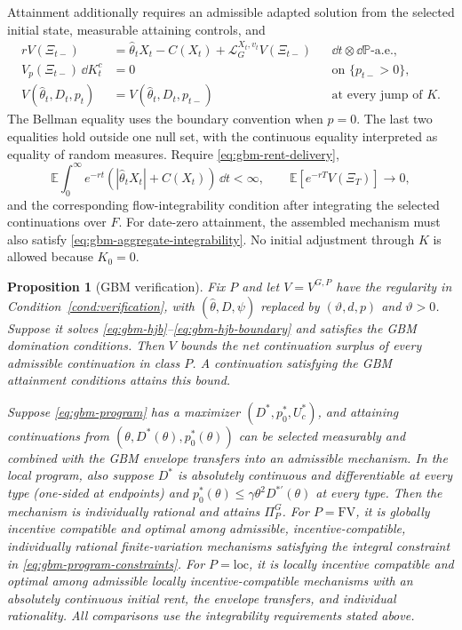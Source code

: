 \documentclass[12pt]{article}
\newtheorem{prop}{Proposition}
\newcommand{\E}{\mathbb{E}}
\newcommand{\hth}{\hat\theta}
\begin{document}
Attainment additionally requires an admissible adapted solution from
the selected initial state, measurable attaining controls, and
\begin{align*}
 rV(\Xi_{t-})
   &=\hth_tX_t-C(X_t)+\mathcal L_G^{X_t,v_t}V(\Xi_{t-})
       &&\dd t\otimes\dd\mathbb P\text{-a.e.},\\
 V_p(\Xi_{t-})\,\dd K_t^c&=0
       &&\text{on }\{p_{t-}>0\},\\
 V(\hth_t,D_t,p_t)&=V(\hth_t,D_t,p_{t-})
       &&\text{at every jump of }K.
\end{align*}
The Bellman equality uses the boundary convention when \(p=0\).
The last two equalities hold outside one null set, with the
continuous equality interpreted as equality of random measures.
Require \eqref{eq:gbm-rent-delivery},
\[
  \E\int_0^\infty e^{-rt}(|\hth_tX_t|+C(X_t))\,\dd t<\infty,
  \qquad \E[e^{-rT}V(\Xi_T)]\longrightarrow0,
\]
and the corresponding flow-integrability condition after integrating
the selected continuations over \(F\). For date-zero attainment, the
assembled mechanism must also satisfy
\eqref{eq:gbm-aggregate-integrability}. No initial adjustment through
\(K\) is allowed because \(K_0=0\).

\begin{prop}[GBM verification]\label{prop:gbm-verification}
Fix \(P\) and let \(V=V^{G,P}\) have the regularity in
Condition~\ref{cond:verification}, with \((\hth,D,\psi)\) replaced by
\((\vartheta,d,p)\) and \(\vartheta>0\). Suppose it solves
\eqref{eq:gbm-hjb}--\eqref{eq:gbm-hjb-boundary} and satisfies the
GBM domination conditions. Then \(V\) bounds the net continuation
surplus of every admissible continuation in class \(P\). A
continuation satisfying the GBM attainment conditions attains this
bound.

Suppose \eqref{eq:gbm-program} has a maximizer
\((D^*,p_0^*,U_c^*)\), and attaining continuations from
\((\theta,D^*(\theta),p_0^*(\theta))\) can be selected measurably
and combined with the GBM envelope transfers into an admissible
mechanism. In the local program, also suppose \(D^*\) is absolutely
continuous and differentiable at every type (one-sided at endpoints)
and \(p_0^*(\theta)\leq\gamma\theta^2D^{*\prime}(\theta)\) at
every type. Then the mechanism is individually rational and attains
\(\Pi_P^G\). For \(P=\mathrm{FV}\), it is globally incentive
compatible and optimal among admissible, incentive-compatible,
individually rational finite-variation mechanisms
satisfying the integral constraint in
\eqref{eq:gbm-program-constraints}. For \(P=\mathrm{loc}\), it is
locally incentive compatible and optimal among admissible locally
incentive-compatible mechanisms with an absolutely continuous initial
rent, the envelope transfers, and individual rationality. All
comparisons use the integrability requirements stated above.
\end{prop}
\end{document}
